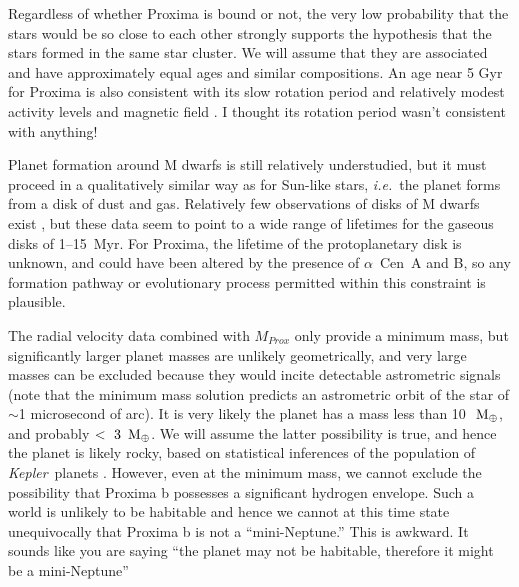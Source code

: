\documentclass[preprint,12pt]{aastex}
\newcommand{\xxx}[1]{{\color{red} #1}} %
\def\mearth{{\rm\,M_\oplus}}
\def\eg{{\it e.g.\ }}
\def\ie{{\it i.e.\ }}
\def\acen{{$\alpha$~Cen}}
\def\kepler{{\it Kepler}}
\begin{document}
Regardless of whether Proxima is bound or not, the very low
probability that the stars would be so close to each other strongly
supports the hypothesis that the stars formed in the same star
cluster. We will assume that they are associated and have
approximately equal ages and similar compositions. An age near 5 Gyr
for Proxima is also consistent with its slow rotation period and relatively
modest activity levels and magnetic field \citep{ReinersBasri08}. 
\xxx{I thought its rotation period wasn't consistent with anything!}

Planet formation around M dwarfs is still relatively understudied, but
it must proceed in a qualitatively similar way as for Sun-like stars,
\ie the planet forms from a disk of dust and gas. Relatively few
observations of disks of M dwarfs exist
\citep[\eg][]{Hernandez07,WilliamsCieza11,Luhman12,Downes15}, but
these data seem to point to a wide range of lifetimes for the gaseous
disks of 1--15~Myr. For Proxima, the lifetime of the protoplanetary
disk is unknown, and could have been altered by the presence of
\acen~A and B, so any formation pathway or \xxx{evolutionary} process
permitted within this constraint is plausible.

The radial velocity data combined with $M_{Prox}$ only provide a
minimum mass, but significantly larger planet masses are unlikely
geometrically, and very large masses can be excluded because they
would incite detectable astrometric signals (note that the minimum
mass solution predicts an astrometric orbit of the star of $\sim$1
microsecond of arc). It is very likely the planet has a mass less than
10~$\mearth$, and probably $<~3~\mearth$. We will assume the latter
possibility is true, and hence the planet is likely rocky, based on
statistical inferences of the population of \kepler~planets
\citep{WeissMarcy14,Rogers15}. However, even at the minimum mass, we
cannot exclude the possibility that Proxima b possesses a significant
hydrogen envelope. Such a world is unlikely to be habitable \citep[but
  see][]{PierrehumbertGaidos11} and hence we cannot at this time state
unequivocally that Proxima b is not a ``mini-Neptune.'' \xxx{This is awkward.
It sounds like you are saying ``the planet may not be habitable, therefore
it might be a mini-Neptune''}
\end{document}
